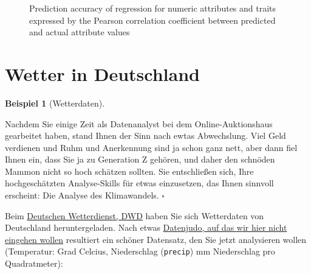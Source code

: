 \documentclass[
  letterpaper,
]{scrbook}
\theoremstyle{definition}
\newtheorem{example}{Beispiel}[chapter]
\theoremstyle{definition}
\theoremstyle{definition}
\theoremstyle{remark}
\begin{document}
\begin{figure}


\caption{\label{fig-pnas1}Prediction accuracy of regression for numeric
attributes and traits expressed by the Pearson correlation coefficient
between predicted and actual attribute values}

\end{figure}%

\section{Wetter in Deutschland}\label{wetter-in-deutschland}

\begin{example}[Wetterdaten]\protect\hypertarget{exm-wetterdaten}{}\label{exm-wetterdaten}

Nachdem Sie einige Zeit als Datenanalyst bei dem Online-Auktionshaus
gearbeitet haben, stand Ihnen der Sinn nach ewtas Abwechslung. Viel Geld
verdienen und Ruhm und Anerkennung sind ja schon ganz nett, aber dann
fiel Ihnen ein, dass Sie ja zu Generation Z gehören, und daher den
schnöden Mammon nicht so hoch schätzen sollten. Sie entschließen sich,
Ihre hochgeschätzten Analyse-Skills für etwas einzusetzen, das Ihnen
sinnvoll erscheint: Die Analyse des Klimawandels. \(\square\)

\end{example}

Beim \href{https://www.dwd.de/DE/Home/home_node.html}{Deutschen
Wetterdienst, DWD} haben Sie sich Wetterdaten von Deutschland
heruntergeladen. Nach etwas
\href{https://data-se.netlify.app/2022/07/24/preparing-german-weather-data/}{Datenjudo,
auf das wir hier nicht eingehen wollen} resultiert ein schöner
Datensatz, den Sie jetzt analysieren wollen (Temperatur: Grad Celcius,
Niederschlag (\texttt{precip}) mm Niederschlag pro Quadratmeter):
\end{document}
